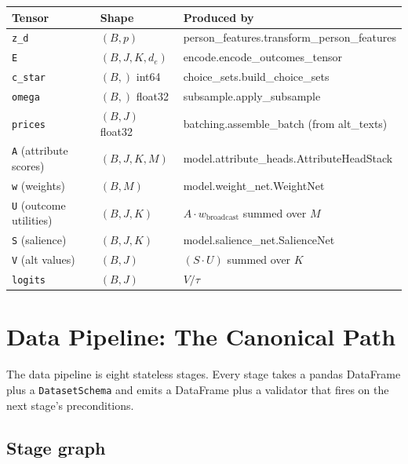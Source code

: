 \documentclass[11pt,a4paper]{article}
\begin{document}
\begin{center}
\small
\begin{tabular}{@{}l l l@{}}
\toprule
Tensor & Shape & Produced by \\
\midrule
\texttt{z\_d}              & $(B, p)$              & person\_features.transform\_person\_features \\
\texttt{E}                 & $(B, J, K, d_e)$      & encode.encode\_outcomes\_tensor \\
\texttt{c\_star}           & $(B,)$ int64          & choice\_sets.build\_choice\_sets \\
\texttt{omega}             & $(B,)$ float32        & subsample.apply\_subsample \\
\texttt{prices}            & $(B, J)$ float32      & batching.assemble\_batch (from alt\_texts) \\
\texttt{A}  (attribute scores)      & $(B, J, K, M)$    & model.attribute\_heads.AttributeHeadStack \\
\texttt{w}  (weights)               & $(B, M)$          & model.weight\_net.WeightNet \\
\texttt{U}  (outcome utilities)     & $(B, J, K)$       & $A \cdot w_{\text{broadcast}}$ summed over $M$ \\
\texttt{S}  (salience)              & $(B, J, K)$       & model.salience\_net.SalienceNet \\
\texttt{V}  (alt values)            & $(B, J)$          & $(S \cdot U)$ summed over $K$ \\
\texttt{logits}                     & $(B, J)$          & $V / \tau$ \\
\bottomrule
\end{tabular}
\end{center}

\section{Data Pipeline: The Canonical Path}
\label{sec:pipeline}

The data pipeline is eight stateless stages. Every stage takes a
pandas DataFrame plus a \texttt{DatasetSchema} and emits a DataFrame
plus a validator that fires on the next stage's preconditions.

\subsection{Stage graph}
\end{document}
